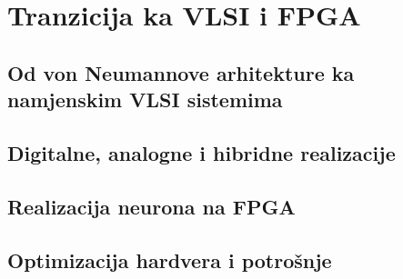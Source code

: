 \section{Tranzicija ka VLSI i FPGA}

\subsection{Od von Neumannove arhitekture ka namjenskim VLSI sistemima}

\subsection{Digitalne, analogne i hibridne realizacije}

\subsection{Realizacija neurona na FPGA}

\subsection{Optimizacija hardvera i potrošnje}
